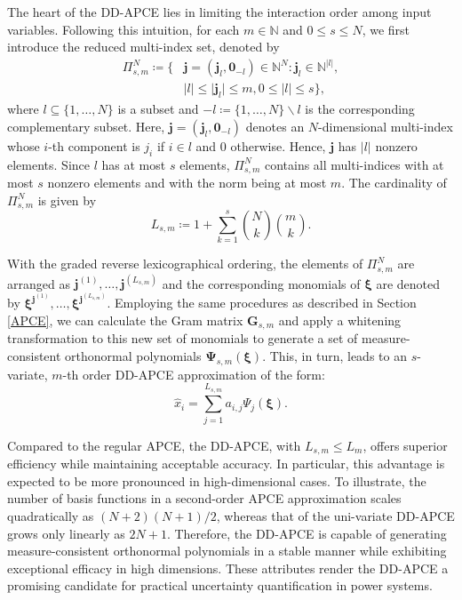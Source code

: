\documentclass[journal]{IEEEtran}
\theoremstyle{definition}
\theoremstyle{remark}
\begin{document}
The heart of the DD-APCE lies in limiting the interaction order among input variables. Following this intuition, for each $m\in \mathbb{N}$ and $0\leq s\leq N$, we first introduce the reduced multi-index set, denoted by
\begin{equation}\label{eq:19}
    \begin{split}
        \Pi_{s,m}^{N}\coloneqq\{&\boldsymbol{j}=(\boldsymbol{j}_l, \mathbf{0}_{-l})\in\mathbb{N}^N:\boldsymbol{j}_l\in\mathbb{N}^{\vert l\vert}, \\
        &\vert l\vert\leq\vert \boldsymbol{j}_l\vert\leq m, 0\leq\vert l\vert\leq s\},
    \end{split}
\end{equation}
where $l\subseteq\{1,\dots,N\}$ is a subset and $-l\coloneqq\{1,\dots,N\}\backslash l$ is the corresponding complementary subset. Here, $\boldsymbol{j}=(\boldsymbol{j}_l,\mathbf{0}_{-l})$ denotes an $N$-dimensional multi-index whose $i$-th component is $j_i$ if $i\in l$ and 0 otherwise. Hence, $\boldsymbol{j}$ has $\vert l\vert$ nonzero elements. Since $l$ has at most $s$ elements, $\Pi_{s,m}^N$ contains all multi-indices with at most $s$ nonzero elements and with the norm being at most $m$. The cardinality of $\Pi_{s,m}^N$ is given by
\begin{equation}\label{eq:20}
    L_{s,m}\coloneqq 1+\sum\limits_{k=1}^s\binom{N}{k}\binom{m}{k}.
\end{equation}

With the graded reverse lexicographical ordering, the elements of $\Pi_{s,m}^N$ are arranged as $\boldsymbol{j}^{(1)},\dots,\boldsymbol{j}^{(L_{s,m})}$ and the corresponding monomials of $\boldsymbol{\xi}$ are denoted by $\boldsymbol{\xi}^{\boldsymbol{j}^{(1)}},\dots,\boldsymbol{\xi}^{\boldsymbol{j}^{(L_{s,m})}}$. Employing the same procedures as described in Section \ref{APCE}, we can calculate the Gram matrix $\boldsymbol{G}_{s,m}$ and apply a whitening transformation to this new set of monomials to generate a set of measure-consistent orthonormal polynomials $\boldsymbol{\Psi}_{s,m}(\boldsymbol{\xi})$. This, in turn, leads to an $s$-variate, $m$-th order DD-APCE approximation of the form:
\begin{equation}
    \hat{x}_i=\sum\limits_{j=1}^{L_{s,m}}a_{i,j}\Psi_j(\boldsymbol{\xi}).
\end{equation}

Compared to the regular APCE, the DD-APCE, with $L_{s,m}\leq L_{m}$, offers superior efficiency while maintaining acceptable accuracy. In particular, this advantage is expected to be more pronounced in high-dimensional cases. To illustrate, the number of basis functions in a second-order APCE approximation scales quadratically as $(N+2)(N+1)/2$, whereas that of the uni-variate DD-APCE grows only linearly as $2N+1$. 
Therefore, the DD-APCE is capable of generating measure-consistent orthonormal polynomials in a stable manner while exhibiting exceptional efficacy in high dimensions. These attributes render the DD-APCE a promising candidate for practical uncertainty quantification in power systems.
\end{document}
